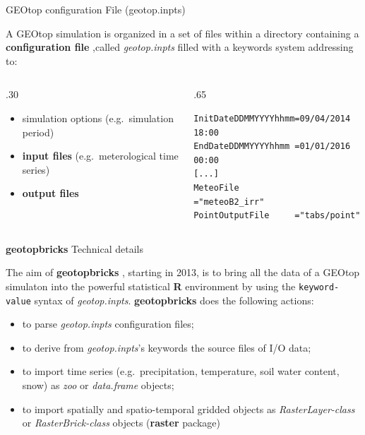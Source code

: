 \documentclass[ignorenonframetext,]{beamer}
\providecommand{\tightlist}{%
  \setlength{\itemsep}{0pt}\setlength{\parskip}{0pt}}
\def\begincols{\begin{columns}}
\def\begincol{\begin{column}}
\def\endcol{\end{column}}
\def\endcols{\end{columns}}
\begin{document}
\begin{frame}[fragile]{GEOtop configuration File (geotop.inpts)}

A GEOtop simulation is organized in a set of files within a directory
containing a \textbf{configuration file} ,called \emph{geotop.inpts}
filled with a keywords system addressing to:

\begincols
 \begincol{.30\textwidth}

\begin{itemize}
\tightlist
\item
  simulation options (e.g.~simulation period)
\item
  \textbf{input files} (e.g.~meterological time series)
\item
  \textbf{output files}
\end{itemize}

\endcol
 \begincol{.65\textwidth}

\begin{verbatim}
InitDateDDMMYYYYhhmm=09/04/2014 18:00  
EndDateDDMMYYYYhhmm =01/01/2016 00:00 
[...] 
MeteoFile           ="meteoB2_irr" 
PointOutputFile     ="tabs/point" 
\end{verbatim}

\endcol
\endcols

\end{frame}

\begin{frame}[fragile]{\textbf{geotopbricks} Technical details}

The aim of \textbf{geotopbricks} , starting in 2013, is to bring all the
data of a GEOtop simulaton into the powerful statistical \textbf{R}
environment by using the \texttt{keyword-value} syntax of
\emph{geotop.inpts}. \textbf{geotopbricks} does the following actions:

\begin{itemize}
\tightlist
\item
  to parse \emph{geotop.inpts} configuration files;
\item
  to derive from \emph{geotop.inpts}'s keywords the source files of I/O
  data;
\item
  to import time series (e.g.~precipitation, temperature, soil water
  content, snow) as \emph{zoo} or \emph{data.frame} objects;
\item
  to import spatially and spatio-temporal gridded objects as
  \emph{RasterLayer-class} or \emph{RasterBrick-class} objects
  (\textbf{raster} package)
\end{itemize}

\end{frame}
\end{document}
